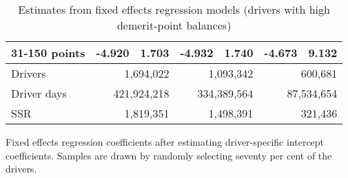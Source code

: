 \begin{table}
\begin{tabular}{l r r r r r r}
31-150 points  & -4.920  &  1.703  & -4.932  &  1.740  & -4.673  &  9.132   \\ 
 

\hline 
 

Drivers 
 & \multicolumn{2}{r}{1,694,022}  & \multicolumn{2}{r}{1,093,342}  & \multicolumn{2}{r}{600,681}   \\ 
 

Driver days 
 & \multicolumn{2}{r}{421,924,218}  & \multicolumn{2}{r}{334,389,564}  & \multicolumn{2}{r}{87,534,654}   \\ 
 

SSR 
 & \multicolumn{2}{r}{1,819,351}  & \multicolumn{2}{r}{1,498,391}  & \multicolumn{2}{r}{321,436}   \\ 
 

\hline 
 
\end{tabular} 
\caption{Estimates from fixed effects regression models (drivers with high demerit-point balances)} 
Fixed effects regression coefficients after estimating driver-specific intercept coefficients. 
Samples are drawn by randomly selecting seventy per cent of the drivers. 
\label{tab:FE_regs_high_pts} 
\end{table} 
 
